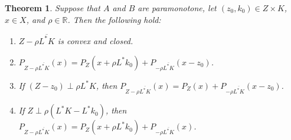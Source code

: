 \documentclass{article}
\newcommand{\RR}{\ensuremath{\mathbb R}}
\newtheorem{theorem}{Theorem}[section]
\newcommand{\cl}[1]{\overline{#1}}
\begin{document}
\begin{theorem}\label{t:proj}
Suppose that $A$ and $B$ are paramonotone, 
let $(z_0,k_0)\in Z\times K$, 
$x\in X$, and $\rho\in\RR$. 
Then the following hold:
\begin{enumerate}
\item\label{t:proj1} 
$Z-\rho \overline{L^*K}$ is convex and closed.
\item\label{t:proj2} 
$P_{Z-\rho \cl{L^*K}}(x)=P_{Z}(x+\rho L^*k_0)+P_{-\rho \cl{L^*K}}(x-z_0)$.
\item\label{t:proj3} 
If $(Z-z_0)\perp \rho L^* K$, 
then $P_{Z-\rho \cl{L^*K}}(x)=P_Z(x)+P_{-\rho \cl{L^*K}}(x-z_0)$.
\item\label{t:proj4} 
If $Z\perp \rho (L^*K- L^*k_0)$, 
then $P_{Z-\rho \cl{L^*K}}(x)= 
P_Z(x+\rho L^* k_0)+P_{-\rho \cl{L^*K}}(x)$.
\end{enumerate}
\end{theorem}
\end{document}

